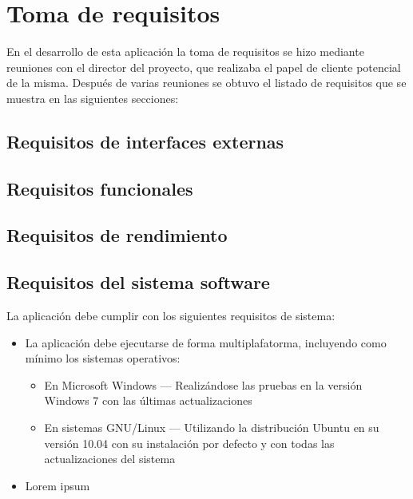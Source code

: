
\section{Toma de requisitos}

En el desarrollo de esta aplicación la toma de requisitos se hizo mediante reuniones con el director del proyecto,
que realizaba el papel de cliente potencial de la misma. Después de varias reuniones se obtuvo el listado de requisitos
que se muestra en las siguientes secciones:

\subsection{Requisitos de interfaces externas}
\subsection{Requisitos funcionales}
\subsection{Requisitos de rendimiento}
\subsection{Requisitos del sistema software}

La aplicación debe cumplir con los siguientes requisitos de sistema:
\begin{itemize}
    \item La aplicación debe ejecutarse de forma multiplafatorma, incluyendo como mínimo los sistemas operativos:
        \begin{itemize}
            \item En Microsoft Windows --- Realizándose las pruebas en la versión Windows 7 con las últimas actualizaciones
            \item En sistemas GNU/Linux --- Utilizando la distribución Ubuntu en su versión 10.04 con su instalación
                    por defecto y con todas las actualizaciones del sistema
        \end{itemize}
    \item Lorem ipsum
\end{itemize}

